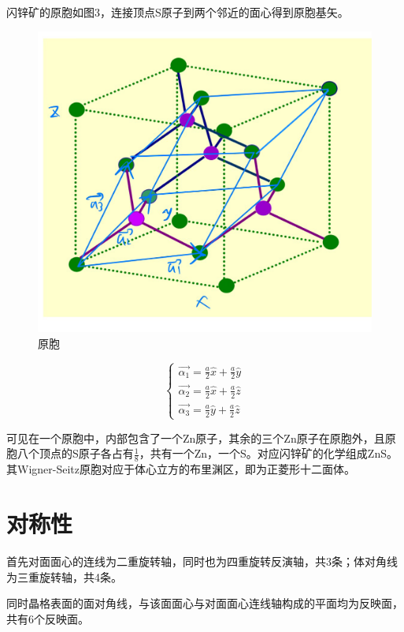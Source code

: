 \documentclass{article}
\begin{document}
闪锌矿的原胞如图3，连接顶点S原子到两个邻近的面心得到原胞基矢。
\begin{figure}[!h]
	
	\centering
	\includegraphics[scale=0.2]{原胞}
	\caption{\heiti{}原胞}
	
\end{figure}
 \begin{equation}
	\begin{cases}
		\vec{\alpha_1}=\frac{a}{2}\hat{x}+\frac{a}{2}\hat{y}\\
		\vec{\alpha_2}=\frac{a}{2}\hat{x}+\frac{a}{2}\hat{z}\\
		\vec{\alpha_3}=\frac{a}{2}\hat{y}+\frac{a}{2}\hat{z}
	\end{cases}
\end{equation}


可见在一个原胞中，内部包含了一个Zn原子，其余的三个Zn原子在原胞外，且原胞八个顶点的S原子各占有$ \frac{1}{8} $，共有一个Zn，一个S。对应闪锌矿的化学组成ZnS。其Wigner-Seitz原胞对应于体心立方的布里渊区，即为正菱形十二面体。


	\section{对称性}
首先对面面心的连线为二重旋转轴，同时也为四重旋转反演轴，共3条；体对角线为三重旋转轴，共4条。


同时晶格表面的面对角线，与该面面心与对面面心连线轴构成的平面均为反映面，共有6个反映面。
\end{document}
